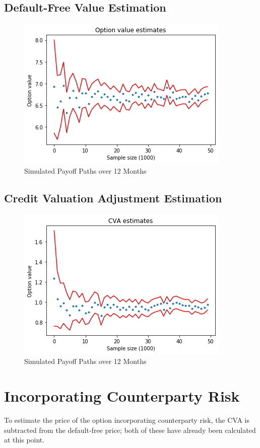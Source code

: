 \documentclass[11pt]{article}
\begin{document}
\subsection{Default-Free Value Estimation}
\begin{figure}
    \centering
    \caption{Simulated Payoff Paths over 12 Months}
    \includegraphics{images/default-free.png}
\end{figure}

\subsection{Credit Valuation Adjustment Estimation}
\begin{figure}
    \centering
    \caption{Simulated Payoff Paths over 12 Months}
    \includegraphics{images/cva.png}
\end{figure}


\section{Incorporating Counterparty Risk}

To estimate the price of the option incorporating counterparty risk, the CVA is subtracted from the default-free price; both of these have already been calculated at this point.
\end{document}
